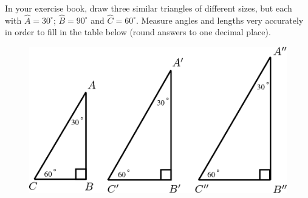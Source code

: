       \label{m39405*id78516}In your exercise book, draw three similar triangles of different sizes, but each with \begin{math}\hat{A}={30}^{\circ }\end{math}; \begin{math}\hat{B}={90}^{\circ }\end{math} and \begin{math}\hat{C}={60}^{\circ }\end{math}. Measure angles and lengths very accurately in order to fill in the table below (round answers to one decimal place).\par 
      \label{m39405*id78597}
        
    \setcounter{subfigure}{0}


	\begin{figure}[H] %
    \begin{center}
    \label{m39405*id78598!!!underscore!!!media}\label{m39405*id78598!!!underscore!!!printimage}\includegraphics{col11306.imgs/m39405_MG10C15_002.png} %
        
      \vspace{2pt}
    \vspace{.1in}
    
    \end{center}

 \end{figure}   

    \addtocounter{footnote}{-0}
    
      \par 
      
    
      
